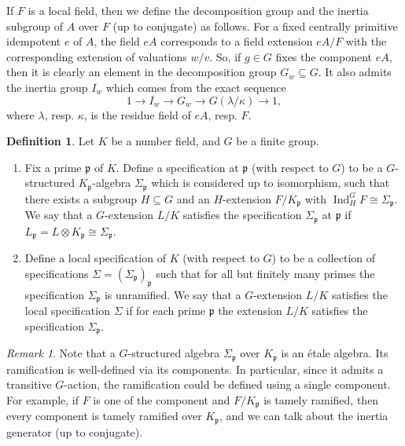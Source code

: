 \documentclass{amsart}
\numberwithin{equation}{section}
\theoremstyle{plain}
\theoremstyle{definition}
\newtheorem{definition}[theorem]{Definition}
\theoremstyle{remark}
\newtheorem*{remark}{Remark}
\begin{document}
If $F$ is a local field, then we define the decomposition group and the inertia subgroup of $A$ over $F$ (up to conjugate) as follows.
For a fixed centrally primitive idempotent $e$ of $A$, the field $eA$ corresponds to a field extension $eA/F$ with the corresponding extension of valuations $w/v$.
So, if $g\in G$ fixes the component $eA$, then it is clearly an element in the decomposition group $G_{w}\subseteq G$.
It also admits the inertia group $I_{w}$ which comes from the exact sequence
\begin{equation*}
	1\to I_{w}\to G_{w}\to G(\lambda/\kappa)\to1,
\end{equation*}
where $\lambda$, resp. $\kappa$, is the residue field of $eA$, resp. $F$.
\begin{definition}
	Let $K$ be a number field, and $G$ be a finite group.
	\begin{enumerate}
		\item Fix a prime $\mathfrak{p}$ of $K$.
        Define a specification at $\mathfrak{p}$ (with respect to $G$) to be a $G$-structured $K_{\mathfrak{p}}$-algebra $\Sigma_{\mathfrak{p}}$ which is considered up to isomorphism, such that there exists a subgroup $H\subseteq G$ and an $H$-extension $F/K_{\mathfrak{p}}$ with $\operatorname{Ind}^G_H F\cong\Sigma_{\mathfrak{p}}$.
		We say that a $G$-extension $L/K$ satisfies the specification $\Sigma_{\mathfrak{p}}$ at $\mathfrak{p}$ if $L_{\mathfrak{p}}=L\otimes K_{\mathfrak{p}}\cong\Sigma_{\mathfrak{p}}$.
		\item Define a local specification of $K$ (with respect to $G$) to be a collection of specifications $\Sigma=(\Sigma_{\mathfrak{p}})_{\mathfrak{p}}$ such that for all but finitely many primes the specification $\Sigma_{\mathfrak{p}}$ is unramified.
		We say that a $G$-extension $L/K$ satisfies the local specification $\Sigma$ if for each prime $\mathfrak{p}$ the extension $L/K$ satisfies the specification $\Sigma_{\mathfrak{p}}$.
	\end{enumerate}
\end{definition}
\begin{remark}
	Note that a $G$-structured algebra $\Sigma_{\mathfrak{p}}$ over $K_{\mathfrak{p}}$ is an {\'e}tale algebra.
	Its ramification is well-defined via its components.
	In particular, since it admits a transitive $G$-action, the ramification could be defined using a single component.
	For example, if $F$ is one of the component and $F/K_{\mathfrak{p}}$ is tamely ramified, then every component is tamely ramified over $K_{\mathfrak{p}}$, and we can talk about the inertia generator (up to conjugate).
\end{remark}
\end{document}
